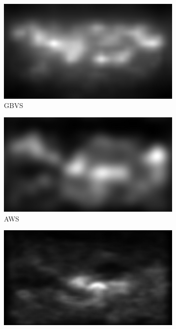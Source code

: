 \begin{figure}[ht]
    \begin{subfigure}{0.24\textwidth}
        \includegraphics[width=\linewidth]{datas/predictions/gbvs_cows_at_a_pond_Bilders_1856.jpg}
        \caption{GBVS}
    \end{subfigure}
    \begin{subfigure}{0.24\textwidth}
        \includegraphics[width=\linewidth]{datas/predictions/aws_cows_at_a_pond_Bilders_1856.jpg}
        \caption{AWS}
    \end{subfigure}
    \begin{subfigure}{0.24\textwidth}
        \includegraphics[width=\linewidth]{datas/predictions/rare2012_cows_at_a_pond_Bilders_1856.jpg}

\end{subfigure}
\end{figure}
